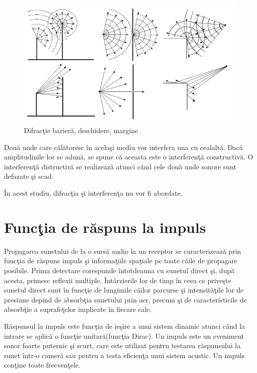 	\begin{figure}[!htb]
		\centering
		\includegraphics[width=12cm]{imagini/difractie.png}
		\caption{Difrac\c{t}ie barier\u{a}, deschidere, margine\cite{elorza}}
		\label{Fig3}
	\end{figure}
	
	Dou\u{a} unde care c\u{a}l\u{a}toresc \^{i}n acela\c{s}i mediu vor interfera una cu cealalt\u{a}. Dac\u{a} amplitudinile lor se adun\u{a}, se spune c\u{a} aceasta este o interferen\c{t}\u{a} constructiv\u{a}. O interferen\c{t}\u{a} distructiv\u{a} se realizeaz\u{a} atunci c\^{a}nd cele dou\u{a} unde sonore sunt defazate \c{s}i scad.
	\bigskip
	
	\^{I}n acest studiu, difrac\c{t}ia \c{s}i interferen\c{t}a nu vor fi abordate.
	
	\section{Func\c{t}ia de r\u{a}spuns la impuls}
	
	Propagarea sunetului de la o surs\u{a} audio la un receptor se caracterizeaz\u{a} prin func\c{t}ia de r\u{a}spuns impuls \c{s}i informa\c{t}iile spa\c{t}iale pe toate c\u{a}ile de propagare posibile. Prima detectare corespunde \^{i}ntotdeauna cu sunetul direct \c{s}i, dup\u{a} acesta, primesc reflexii multiple. \^{I}nt\^{a}rzierile lor de timp \^{i}n ceea ce prive\c{s}te sunetul direct sunt \^{i}n func\c{t}ie de lungimile c\u{a}ilor parcurse \c{s}i intensit\u{a}\c{t}ile lor de presiune depind de absorb\c{t}ia sunetului prin aer, precum \c{s}i de caracteristicile de absorb\c{t}ie a suprafe\c{t}elor implicate \^{i}n fiecare cale.
	\bigskip
	
	R\u{a}spunsul la impuls este func\c{t}ia de ie\c{s}ire a unui sistem dinamic atunci c\^{a}nd la intrare se aplic\u{a} o func\c{t}ie unitar\u{a}(func\c{t}ia Dirac). Un impuls este un eveniment sonor foarte puternic \c{s}i scurt, care este utilizat pentru testarea r\u{a}spunsului la sunet \^{i}ntr-o camer\u{a} sau pentru a testa eficien\c{t}a unui sistem acustic. Un impuls con\c{t}ine toate frecven\c{t}ele.
	\bigskip 
	
